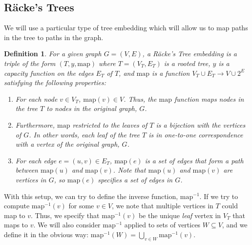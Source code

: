 \documentclass[12pt]{article}
\newtheorem{definition}{Definition}
\begin{document}
\subsection{R\"{a}cke's Trees}

We will use a particular type of tree embedding which will allow us to map paths in the tree to paths in the graph. 

\begin{definition}
For a given graph $G = (V, E)$, a R\"{a}cke's Tree embedding is a triple of the form $(T,y,\mathrm{map})$ where $T = (V_T,E_T)$ is a rooted tree, $y$ is a capacity function on the edges $E_T$ of $T$, and $\mathrm{map}$ is a function $V_T \cup E_T \to V \cup 2^E$ satisfying the following properties:
\begin{enumerate}
\item For each node $v \in V_T$, $\mathrm{map}(v) \in V$. Thus, the $\mathrm{map}$ function maps nodes in the tree $T$ to nodes in the original graph, $G$.
\item Furthermore, $\mathrm{map}$ restricted to the leaves of $T$ is a bijection with the vertices of $G$. In other words, each leaf of the tree $T$ is in one-to-one correspondence with a vertex of the original graph, $G$.
\item For each edge $e = (u,v) \in E_T$, $\mathrm{map}(e)$ is a set of edges that form a path between $\mathrm{map}(u)$ and $\mathrm{map}(v)$. Note that $\mathrm{map}(u)$ and $\mathrm{map}(v)$ are vertices in $G$, so $\mathrm{map}(e)$ specifies a set of edges in $G$.
\end{enumerate}
\end{definition}

With this setup, we can try to define the inverse function, $\mathrm{map}^{-1}$. If we try to compute $\mathrm{map}^{-1}(v)$ for some $v \in V$, we note that multiple vertices in $T$ could map to $v$. Thus, we specify that $\mathrm{map}^{-1}(v)$ be the unique \emph{leaf} vertex in $V_T$ that maps to $v$. We will also consider $\mathrm{map}^{-1}$ applied to sets of vertices $W \subseteq V$, and we define it in the obvious way: $\mathrm{map}^{-1}(W) = \bigcup_{v \in W} \mathrm{map}^{-1}(v)$.
\end{document}
